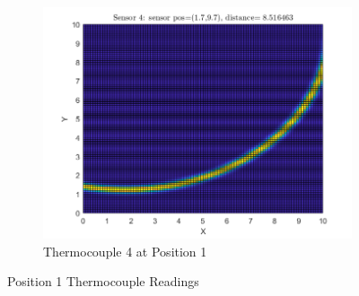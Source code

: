 \documentclass[12pt]{article}
\begin{document}
\begin{figure}[H]
\begin{subfigure}[h]{0.4\textwidth}
        \includegraphics[width=\textwidth]{images/P1S4.png}
        \caption{Thermocouple 4 at Position 1}
        \label{fig:P1S4}
    \end{subfigure}
\caption{Position 1 Thermocouple Readings}
\label{fig:P1}
\end{figure}
\end{document}

